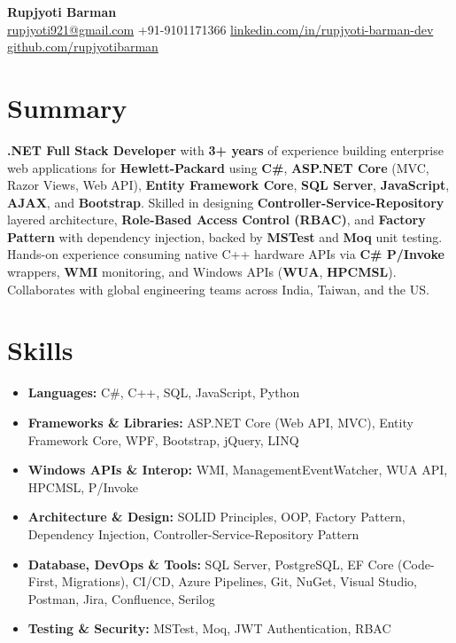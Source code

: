 \documentclass[a4paper,10pt]{article}
\begin{document}
\begin{center}
    {\LARGE \textbf{Rupjyoti Barman}} \\[2pt]
    \href{mailto:rupjyoti921@gmail.com}{rupjyoti921@gmail.com} \textbar{} +91-9101171366 \textbar{} \href{https://www.linkedin.com/in/rupjyoti-barman-dev}{linkedin.com/in/rupjyoti-barman-dev} \textbar{} \href{https://github.com/rupjyotibarman}{github.com/rupjyotibarman}
\end{center}

\section*{Summary}
\textbf{.NET Full Stack Developer} with \textbf{3+ years} of experience building enterprise web applications for \textbf{Hewlett-Packard} using \textbf{C\#}, \textbf{ASP.NET Core} (MVC, Razor Views, Web API), \textbf{Entity Framework Core}, \textbf{SQL Server}, \textbf{JavaScript}, \textbf{AJAX}, and \textbf{Bootstrap}. Skilled in designing \textbf{Controller-Service-Repository} layered architecture, \textbf{Role-Based Access Control (RBAC)}, and \textbf{Factory Pattern} with dependency injection, backed by \textbf{MSTest} and \textbf{Moq} unit testing. Hands-on experience consuming native C++ hardware APIs via \textbf{C\# P/Invoke} wrappers, \textbf{WMI} monitoring, and Windows APIs (\textbf{WUA}, \textbf{HPCMSL}). Collaborates with global engineering teams across India, Taiwan, and the US.

\section*{Skills}
\begin{itemize}[leftmargin=*, itemsep=3pt, parsep=0pt, topsep=2pt]
    \item \textbf{Languages:} C\#, C++, SQL, JavaScript, Python
    \item \textbf{Frameworks \& Libraries:} ASP.NET Core (Web API, MVC), Entity Framework Core, WPF, Bootstrap, jQuery, LINQ
    \item \textbf{Windows APIs \& Interop:} WMI, ManagementEventWatcher, WUA API, HPCMSL, P/Invoke
    \item \textbf{Architecture \& Design:} SOLID Principles, OOP, Factory Pattern, Dependency Injection, Controller-Service-Repository Pattern
    \item \textbf{Database, DevOps \& Tools:} SQL Server, PostgreSQL, EF Core (Code-First, Migrations), CI/CD, Azure Pipelines, Git, NuGet, Visual Studio, Postman, Jira, Confluence, Serilog
    \item \textbf{Testing \& Security:} MSTest, Moq, JWT Authentication, RBAC
\end{itemize}
\end{document}
